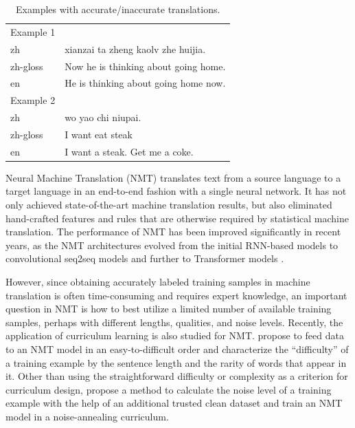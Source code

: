 \documentclass[letterpaper]{article}
\begin{document}
\begin{table}[tb]
  \label{tab:sample}
  \centering
  \begin{tabular}{ll}
    \toprule
    Example 1 & \\
    zh & xianzai ta zheng kaolv zhe huijia.\\
    zh-gloss & Now he is thinking about going home.\\
    en & He is thinking about going home now.\\
    \midrule
    Example 2 & \\
    zh & wo yao chi niupai.\\
    zh-gloss & I want eat steak\\
    en & I want a steak. Get me a coke.\\
    \bottomrule
  \end{tabular}
  \caption{Examples with accurate/inaccurate translations.}
\end{table}

Neural Machine Translation \cite{kalchbrenner2013recurrent} \cite{sutskever2014sequence} (NMT) translates text from a source language to a target language in an end-to-end fashion with a single neural network. It has not only achieved state-of-the-art machine translation results, but also eliminated hand-crafted features and rules that are otherwise required by statistical machine translation. The performance of NMT has been improved significantly in recent years, as the NMT architectures evolved from the initial RNN-based models \cite{sutskever2014sequence} to convolutional seq2seq models \cite{gehring2017convolutional} and further to Transformer models \cite{vaswani2017attention}.  

However, since obtaining accurately labeled training samples in machine translation is often time-consuming and requires expert knowledge, an important question in NMT is how to best utilize a limited number of available training samples, perhaps with different lengths, qualities, and noise levels.
Recently, the application of curriculum learning is also studied for NMT. \cite{platanios2019competence} propose to feed data to an NMT model in an easy-to-difficult order and characterize the ``difficulty'' of a training example by the sentence length and the rarity of words that appear in it. Other than using the straightforward difficulty or complexity as a criterion for curriculum design, \cite{wang2018denoising} propose a method to calculate the noise level of a training example with the help of an additional trusted clean dataset and train an NMT model in a noise-annealing curriculum. 
\end{document}
